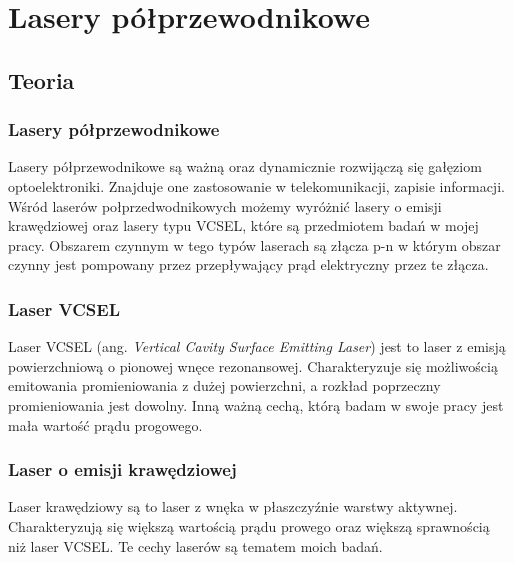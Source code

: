 \chapter{Lasery półprzewodnikowe}
\section{Teoria}
\subsection{Lasery półprzewodnikowe}
Lasery półprzewodnikowe są ważną oraz dynamicznie rozwijączą się gałęziom optoelektroniki. Znajduje one zastosowanie w telekomunikacji,
zapisie informacji. Wśród laserów połprzedwodnikowych możemy wyróżnić lasery o emisji krawędziowej oraz lasery typu VCSEL, które są przedmiotem
badań w mojej pracy. Obszarem czynnym w tego typów laserach są złącza p-n w którym obszar czynny jest pompowany przez przepływający prąd elektryczny
przez te złącza.
\subsection{Laser VCSEL}
Laser VCSEL (ang. \textit{Vertical Cavity Surface Emitting Laser}) jest to laser z emisją powierzchniową o pionowej wnęce rezonansowej.
Charakteryzuje się możliwością emitowania promieniowania z dużej powierzchni, a rozkład poprzeczny promieniowania jest dowolny.
Inną ważną cechą, którą badam w swoje pracy jest mała wartość prądu progowego.
\subsection{Laser o emisji krawędziowej}
Laser krawędziowy są to laser z wnęka w  płaszczyźnie warstwy aktywnej. Charakteryzują się większą wartością prądu prowego
oraz większą sprawnością niż laser VCSEL. Te cechy laserów są tematem moich badań.
